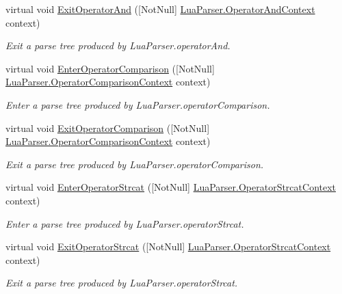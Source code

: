 \begin{DoxyCompactItemize}
virtual void \mbox{\hyperlink{classzlua_1_1_lua_base_listener_ad0372c70a4c0b53a69f958e1d8c16065}{Exit\+Operator\+And}} (\mbox{[}Not\+Null\mbox{]} \mbox{\hyperlink{classzlua_1_1_lua_parser_1_1_operator_and_context}{Lua\+Parser.\+Operator\+And\+Context}} context)
\begin{DoxyCompactList}\small\item\em Exit a parse tree produced by Lua\+Parser.\+operator\+And. \end{DoxyCompactList}\item 
virtual void \mbox{\hyperlink{classzlua_1_1_lua_base_listener_a27a11e4053e2a7c40f464e0a893bbf70}{Enter\+Operator\+Comparison}} (\mbox{[}Not\+Null\mbox{]} \mbox{\hyperlink{classzlua_1_1_lua_parser_1_1_operator_comparison_context}{Lua\+Parser.\+Operator\+Comparison\+Context}} context)
\begin{DoxyCompactList}\small\item\em Enter a parse tree produced by Lua\+Parser.\+operator\+Comparison. \end{DoxyCompactList}\item 
virtual void \mbox{\hyperlink{classzlua_1_1_lua_base_listener_a650d952f0fddbd4ddb499a7074528e60}{Exit\+Operator\+Comparison}} (\mbox{[}Not\+Null\mbox{]} \mbox{\hyperlink{classzlua_1_1_lua_parser_1_1_operator_comparison_context}{Lua\+Parser.\+Operator\+Comparison\+Context}} context)
\begin{DoxyCompactList}\small\item\em Exit a parse tree produced by Lua\+Parser.\+operator\+Comparison. \end{DoxyCompactList}\item 
virtual void \mbox{\hyperlink{classzlua_1_1_lua_base_listener_a3bcff2132c345b7cc97fd7782d4f6463}{Enter\+Operator\+Strcat}} (\mbox{[}Not\+Null\mbox{]} \mbox{\hyperlink{classzlua_1_1_lua_parser_1_1_operator_strcat_context}{Lua\+Parser.\+Operator\+Strcat\+Context}} context)
\begin{DoxyCompactList}\small\item\em Enter a parse tree produced by Lua\+Parser.\+operator\+Strcat. \end{DoxyCompactList}\item 
virtual void \mbox{\hyperlink{classzlua_1_1_lua_base_listener_a120cd0798009d1b1574ac0ec556482a7}{Exit\+Operator\+Strcat}} (\mbox{[}Not\+Null\mbox{]} \mbox{\hyperlink{classzlua_1_1_lua_parser_1_1_operator_strcat_context}{Lua\+Parser.\+Operator\+Strcat\+Context}} context)
\begin{DoxyCompactList}\small\item\em Exit a parse tree produced by Lua\+Parser.\+operator\+Strcat. \end{DoxyCompactList}\item 

\end{DoxyCompactItemize}
